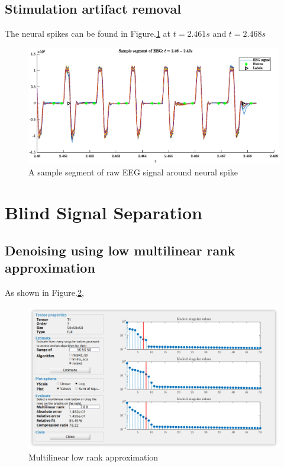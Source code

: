 \documentclass[pagesize,english,DIV=calc,footinclude=false
]{scrartcl}
\begin{document}
\subsection{Stimulation artifact removal}

The neural spikes can be found in Figure.\ref{fig:stimu_sample} at $t=2.461s$ and $t=2.468s$

\begin{figure}[htbp]
  \centering
  \includegraphics[width=\linewidth]{stimu_sample_seg.eps}
  \caption{A sample segment of raw EEG signal around neural spike}
  \label{fig:stimu_sample}
\end{figure}

\section{Blind Signal Separation}

\subsection{Denoising using low multilinear rank approximation}

As shown in Figure.\ref{fig:mlrank_esti}, 

\begin{figure}[htbp]
  \centering
  \includegraphics[width=\linewidth]{mlrank_esti.png}
  \caption{Multilinear low rank approximation}
  \label{fig:mlrank_esti}
\end{figure}
\end{document}
